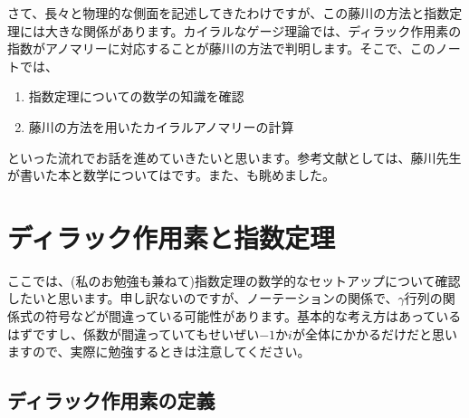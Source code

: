\documentclass[unicode,a4paper,10pt]{ltjsarticle}
\begin{document}
さて、長々と物理的な側面を記述してきたわけですが、この藤川の方法と指数定理には大きな関係があります。カイラルなゲージ理論では、ディラック作用素の指数がアノマリーに対応することが藤川の方法で判明します。そこで、このノートでは、
\begin{enumerate}
  \item 
  指数定理についての数学の知識を確認
  \item 
  藤川の方法を用いたカイラルアノマリーの計算
\end{enumerate}
といった流れでお話を進めていきたいと思います。参考文献としては、藤川先生が書いた本\cite{Fujikawa:2001b}と数学については\cite{Nakahara:2003}です。また、\cite{Peskin:1995,Nair:2005}も眺めました。



\section{ディラック作用素と指数定理}

ここでは、(私のお勉強も兼ねて)指数定理の数学的なセットアップについて確認したいと思います。申し訳ないのですが、ノーテーションの関係で、$\gamma$行列の関係式の符号などが間違っている可能性があります。基本的な考え方はあっているはずですし、係数が間違っていてもせいぜい$-1$か$i$が全体にかかるだけだと思いますので、実際に勉強するときは注意してください。

\subsection{ディラック作用素の定義}






























\clearpage


\end{document}

